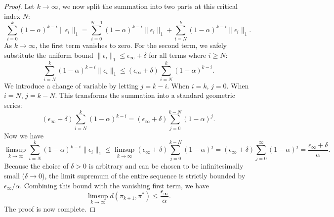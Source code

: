 \documentclass{article}
\theoremstyle{plain}
\theoremstyle{definition}
\theoremstyle{remark}
\begin{document}
\begin{proof}
	Let $k\to\infty$, we now split the summation into two parts at this critical index $N$:
	\begin{equation}
		\sum_{i=0}^{k}(1-\alpha)^{k-i}\lVert\epsilon_i\rVert_1=\sum_{i=0}^{N-1}(1-\alpha)^{k-i}\lVert\epsilon_i\rVert_1+\sum_{i=N}^{k}(1-\alpha)^{k-i}\lVert\epsilon_i\rVert_1.
	\end{equation}
	As $k \to \infty$, the first term vanishes to zero. For the second term, we safely substitute the uniform bound $\lVert\epsilon_i\rVert_1 \leq \epsilon_{\infty} + \delta$ for all terms where $i \geq N$:
	\begin{equation}
		\sum_{i=N}^{k}(1-\alpha)^{k-i}\lVert\epsilon_i\rVert_1\leq(\epsilon_{\infty}+\delta)\sum_{i=N}^{k}(1-\alpha)^{k-i}.
	\end{equation}
	We introduce a change of variable by letting $j = k - i$. When $i = k$, $j=0$. When $i=N$, $j = k - N$. This transforms the summation into a standard geometric series:
	\begin{equation}
		(\epsilon_{\infty}+\delta)\sum_{i=N}^{k}(1-\alpha)^{k-i}=(\epsilon_{\infty}+\delta)\sum_{j=0}^{k-N}(1-\alpha)^{j}.
	\end{equation}
	Now we have
	\begin{equation}
		\limsup_{k\rightarrow \infty}\sum_{i=N}^{k}(1-\alpha)^{k-i}\lVert\epsilon_i\rVert_1\leq\limsup_{k\rightarrow \infty}(\epsilon_{\infty}+\delta)\sum_{j=0}^{k-N}(1-\alpha)^{j}=(\epsilon_{\infty}+\delta)\sum_{j=0}^{\infty}(1-\alpha)^{j}=\frac{\epsilon_{\infty}+\delta}{\alpha}.
	\end{equation}
	Because the choice of $\delta > 0$ is arbitrary and can be chosen to be infinitesimally small ($\delta \to 0$), the limit supremum of the entire sequence is strictly bounded by $\epsilon_{\infty}/\alpha$. Combining this bound with the vanishing first term, we have
	\begin{equation}
		\limsup_{k \rightarrow \infty}d(\pi_{k+1}, \pi^*)\leq\frac{\epsilon_{\infty}}{\alpha}.
	\end{equation}
	The proof is now complete.
\end{proof}
\end{document}
